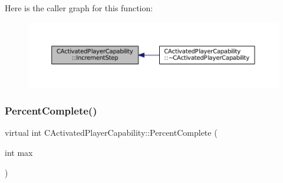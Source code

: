 Here is the caller graph for this function\+:
\nopagebreak
\begin{figure}[H]
\begin{center}
\leavevmode
\includegraphics[width=350pt]{classCActivatedPlayerCapability_a943b5999a57504399293250382c0ec6a_icgraph}
\end{center}
\end{figure}
\hypertarget{classCActivatedPlayerCapability_a405dc6076058006a4f801727de4cfe4d}{}\label{classCActivatedPlayerCapability_a405dc6076058006a4f801727de4cfe4d} 
\subsubsection{\texorpdfstring{Percent\+Complete()}{PercentComplete()}}
{\footnotesize\ttfamily virtual int C\+Activated\+Player\+Capability\+::\+Percent\+Complete (\begin{DoxyParamCaption}\item[{int}]{max }\end{DoxyParamCaption})\hspace{0.3cm}{\ttfamily [pure virtual]}}




